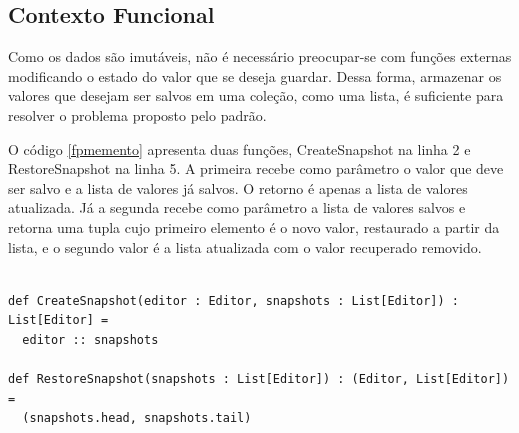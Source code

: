 \subsection*{Contexto Funcional}

Como os dados são imutáveis, não é necessário 
preocupar-se com funções externas modificando o 
estado do valor que se deseja guardar. Dessa forma, 
armazenar os valores que desejam ser salvos em 
uma coleção, como uma lista, é suficiente para 
resolver o problema proposto pelo padrão.

O código \ref{fpmemento} apresenta duas funções, 
CreateSnapshot na linha 2 e RestoreSnapshot na linha 
5. A primeira recebe como parâmetro o valor que 
deve ser salvo e a lista de valores já salvos. 
O retorno é apenas a lista de valores atualizada. 
Já a segunda recebe como parâmetro a lista de 
valores salvos e retorna uma tupla cujo 
primeiro elemento é o novo valor, restaurado 
a partir da lista, e o segundo valor é a 
lista atualizada com o valor recuperado 
removido.

\begin{lstlisting}[caption={Memento Funcional},label=fpmemento]

def CreateSnapshot(editor : Editor, snapshots : List[Editor]) : List[Editor] =
  editor :: snapshots

def RestoreSnapshot(snapshots : List[Editor]) : (Editor, List[Editor]) =
  (snapshots.head, snapshots.tail)

\end{lstlisting}